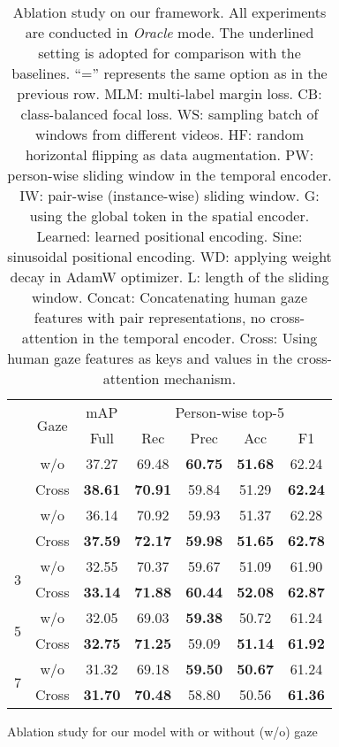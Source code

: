 \documentclass[times,twocolumn,final,authoryear]{elsarticle}
\begin{document}
\begin{table}
    \begin{subtable}[]{0.47\textwidth}
        \centering
        \small
        \begin{tabular}{|c|c|c|c c c c|}
            \hline
            \multirow{2}{*}{} & \multirow{2}{*}{Gaze} & mAP & \multicolumn{4}{c|}{Person-wise top-5} \\
            \cline{3-7}
            & & Full & Rec & Prec & Acc & F1 \\
            \hhline{|=|=|=|= = = =|}
            \multirow{2}{*}{0} & w/o & 37.27 & 69.48 & \textbf{60.75} & \textbf{51.68} & 62.24 \\
            & Cross & \textbf{38.61} & \textbf{70.91} & 59.84 & 51.29 & \textbf{62.24} \\
            \hhline{|=|=|=|= = = =|}
            \multirow{2}{*}{1} & w/o & 36.14 & 70.92 & 59.93 & 51.37 & 62.28 \\
            & Cross & \textbf{37.59} & \textbf{72.17} & \textbf{59.98} & \textbf{51.65} & \textbf{62.78}\\
            \hline
            \multirow{2}{*}{3} & w/o & 32.55 & 70.37 & 59.67 & 51.09 & 61.90 \\
            & Cross & \textbf{33.14} & \textbf{71.88} & \textbf{60.44} & \textbf{52.08} & \textbf{62.87}\\
            \hline
            \multirow{2}{*}{5} & w/o & 32.05 & 69.03 & \textbf{59.38} & 50.72 & 61.24 \\
            & Cross & \textbf{32.75} & \textbf{71.25} & 59.09 & \textbf{51.14} & \textbf{61.92}\\
            \hline
            \multirow{2}{*}{7} & w/o & 31.32 & 69.18 & \textbf{59.50} & \textbf{50.67} & 61.24 \\
            & Cross & \textbf{31.70} & \textbf{70.48} & 58.80 & 50.56 & \textbf{61.36}\\
            \hline
        \end{tabular}
        \caption{Ablation study for our model with or without (w/o) gaze}
        \label{table:ablation_gaze}
    \end{subtable}
    
    \caption{Ablation study on our framework. All experiments are conducted in \emph{Oracle} mode. The underlined setting is adopted for comparison with the baselines. ``='' represents the same option as in the previous row. MLM: multi-label margin loss. CB: class-balanced focal loss. WS: sampling batch of windows from different videos. HF: random horizontal flipping as data augmentation. PW: person-wise sliding window in the temporal encoder. IW: pair-wise (instance-wise) sliding window. G: using the global token in the spatial encoder. Learned: learned positional encoding. Sine: sinusoidal positional encoding. WD: applying weight decay in AdamW optimizer. L: length of the sliding window. Concat: Concatenating human gaze features with pair representations, no cross-attention in the temporal encoder. Cross: Using human gaze features as keys and values in the cross-attention mechanism.}
    \label{table:ablation}
\end{table}
\end{document}
